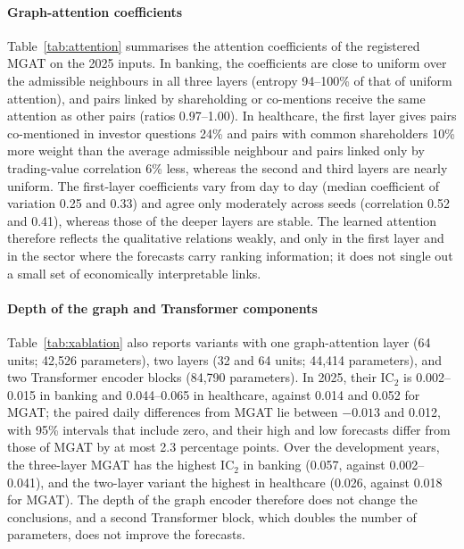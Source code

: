 \documentclass[pdflatex,sn-mathphys-num]{sn-jnl}%
\theoremstyle{thmstyleone}%
\theoremstyle{thmstyletwo}%
\theoremstyle{thmstylethree}%
\begin{document}
{\paragraph{Graph-attention coefficients}
Table~\ref{tab:attention} summarises the attention coefficients of the registered MGAT on the 2025 inputs. In banking, the coefficients are close to uniform over the admissible neighbours in all three layers (entropy 94--100\% of that of uniform attention), and pairs linked by shareholding or co-mentions receive the same attention as other pairs (ratios 0.97--1.00). In healthcare, the first layer gives pairs co-mentioned in investor questions 24\% and pairs with common shareholders 10\% more weight than the average admissible neighbour and pairs linked only by trading-value correlation 6\% less, whereas the second and third layers are nearly uniform. The first-layer coefficients vary from day to day (median coefficient of variation 0.25 and 0.33) and agree only moderately across seeds (correlation 0.52 and 0.41), whereas those of the deeper layers are stable. The learned attention therefore reflects the qualitative relations weakly, and only in the first layer and in the sector where the forecasts carry ranking information; it does not single out a small set of economically interpretable links.

\paragraph{Depth of the graph and Transformer components}
Table~\ref{tab:xablation} also reports variants with one graph-attention layer (64 units; 42{,}526 parameters), two layers (32 and 64 units; 44{,}414 parameters), and two Transformer encoder blocks (84{,}790 parameters). In 2025, their IC$_2$ is 0.002--0.015 in banking and 0.044--0.065 in healthcare, against 0.014 and 0.052 for MGAT; the paired daily differences from MGAT lie between $-0.013$ and 0.012, with 95\% intervals that include zero, and their high and low forecasts differ from those of MGAT by at most 2.3 percentage points. Over the development years, the three-layer MGAT has the highest IC$_2$ in banking (0.057, against 0.002--0.041), and the two-layer variant the highest in healthcare (0.026, against 0.018 for MGAT). The depth of the graph encoder therefore does not change the conclusions, and a second Transformer block, which doubles the number of parameters, does not improve the forecasts.

}
\end{document}
